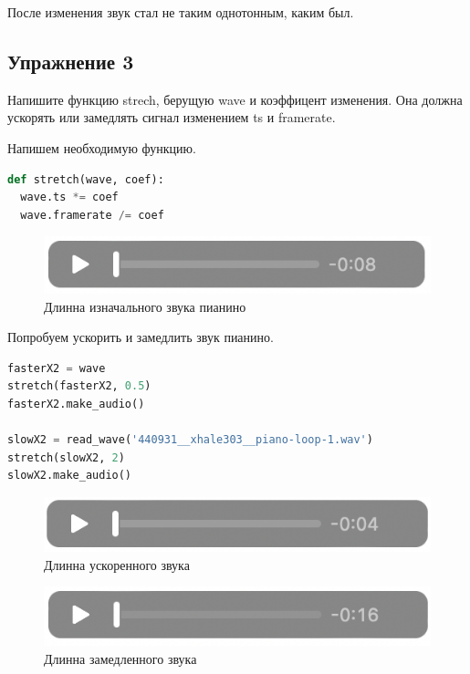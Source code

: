 После изменения звук стал не таким однотонным, каким был. 


\subsection{Упражнение 3}

Напишите функцию strech, берущую wave и коэффицент изменения. Она должна ускорять или замедлять сигнал изменением ts и framerate.

Напишем необходимую функцию.

\begin{lstlisting}[language=Python]
def stretch(wave, coef):
  wave.ts *= coef
  wave.framerate /= coef
\end{lstlisting}

\begin{figure}[H]
	\begin{center}
		\includegraphics[scale=1]{fig/lab01/lab01_9.png}
		\caption{Длинна изначального звука пианино}
	\end{center}
\end{figure}

Попробуем ускорить и замедлить звук пианино.

\begin{lstlisting}[language=Python]
fasterX2 = wave
stretch(fasterX2, 0.5)
fasterX2.make_audio()

slowX2 = read_wave('440931__xhale303__piano-loop-1.wav')
stretch(slowX2, 2)
slowX2.make_audio()
\end{lstlisting}

\begin{figure}[H]
	\begin{center}
		\includegraphics[scale=1]{fig/lab01/lab01_10.png}
		\caption{Длинна ускоренного звука}
	\end{center}
\end{figure}

\begin{figure}[H]
	\begin{center}
		\includegraphics[scale=1]{fig/lab01/lab01_11.png}
		\caption{Длинна замедленного звука}
	\end{center}
\end{figure}


